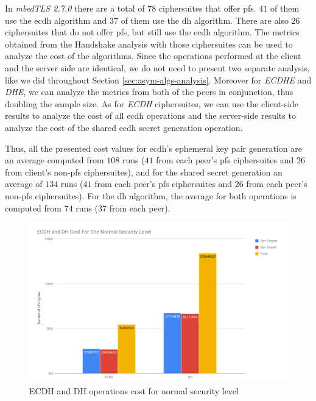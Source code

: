 In \textit{mbedTLS 2.7.0} there are a total of $78$ ciphersuites that offer \gls{pfs}. $41$ of them use the \gls{ecdh} algorithm and $37$ of them use
the \gls{dh} algorithm. There are also $26$ ciphersuites that do not offer \gls{pfs}, but still use the \gls{ecdh} algorithm. The metrics obtained from the
Handshake analysis with those ciphersuites can be used to analyze the cost of the algorithms. Since the operations performed at the client and
the server side are identical, we do not need to present two separate analysis, like we did throughout Section \ref{sec:asym-algs-analysis}.
Moreover for \textit{ECDHE} and \textit{DHE}, we can analyze the metrics from both  of the peers in conjunction, thus doubling the sample size.
As for \textit{ECDH} ciphersuites, we can use the client-side results to analyze the cost of all \gls{ecdh} operations and the server-side results
to analyze the cost of the shared \gls{ecdh} secret generation operation.

Thus, all the presented cost values for \gls{ecdh}'s ephemeral key pair generation are an average computed from $108$ runs ($41$ from each
peer's \gls{pfs} ciphersuites and $26$ from client's non-\gls{pfs} ciphersuites),
and for the shared secret generation an average of $134$ runs ($41$ from each peer's \gls{pfs} ciphersuites and $26$ from each peer's non-\gls{pfs}
ciphersuites). For the \gls{dh} algorithm, the average for both operations is computed from $74$ runs ($37$ from each peer).

\begin{figure}
  \centering
  \includegraphics[width=1.0\textwidth]{img/ecdh-dh-cost-normal-sl.png}
  \centering \caption{\label{fig:ecdh-dh-cost-normal-sl} ECDH and DH operations cost for normal security level}
\end{figure}

